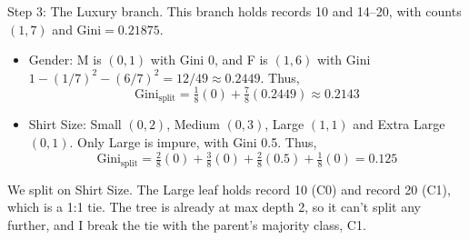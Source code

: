 \documentclass[12pt,letterpaper, onecolumn]{exam}
\begin{document}
\begin{questions}
\begin{solution}
        Step 3: The Luxury branch. This branch holds records 10 and 14--20, with counts $(1,7)$ and $\text{Gini}=0.21875$.
        \begin{itemize}
            \item Gender: M is $(0,1)$ with Gini 0, and F is $(1,6)$ with Gini $1-(1/7)^2-(6/7)^2 = 12/49\approx 0.2449$. Thus,
            \begin{equation*}
                \text{Gini}_{\text{split}} = \tfrac{1}{8}(0)+\tfrac{7}{8}(0.2449) \approx 0.2143
            \end{equation*}
            \item Shirt Size: Small $(0,2)$, Medium $(0,3)$, Large $(1,1)$ and Extra Large $(0,1)$. Only Large is impure, with Gini 0.5. Thus,
            \begin{equation*}
                \text{Gini}_{\text{split}} = \tfrac{2}{8}(0)+\tfrac{3}{8}(0)+\tfrac{2}{8}(0.5)+\tfrac{1}{8}(0) = 0.125
            \end{equation*}
        \end{itemize}
        We split on Shirt Size. The Large leaf holds record 10 (C0) and record 20 (C1), which is a 1:1 tie. The tree is already at max depth 2, so it can't split any further, and I break the tie with the parent's majority class, C1.


\end{solution}
\end{questions}
\end{document}
